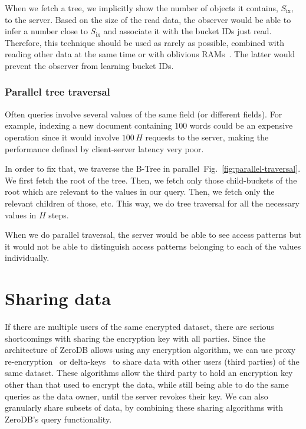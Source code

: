 \documentclass[notitlepage,longbibliography]{revtex4-1}
\newcommand{\figref}[1]{Fig.~\ref{#1}}
\begin{document}
When we fetch a tree, we implicitly show the number of objects it contains, $S_{\mbox{ix}}$, to the server.
Based on the size of the read data, the observer would be able to infer a number close to $S_{\mbox{ix}}$ and associate it with the bucket IDs just read.
Therefore, this technique should be used as rarely as possible, combined with reading other data at the same time or with oblivious RAMs~\cite{path-oram,burst-oram,oram-multicloud,ods-wang-2014}.
The latter would prevent the observer from learning bucket IDs.

\subsubsection{Parallel tree traversal}
\label{sec:parallel-traversal}

Often queries involve several values of the same field (or different fields).
For example, indexing a new document containing $100$ words could be an expensive operation since it would involve $100\,H$ requests to the server, making the performance defined by client-server latency very poor.

In order to fix that, we traverse the B-Tree in parallel~\figref{fig:parallel-traversal}.
We first fetch the root of the tree.
Then, we fetch only those child-buckets of the root which are relevant to the values in our query.
Then, we fetch only the relevant children of those, etc.
This way, we do tree traversal for all the necessary values in $H$ steps.

When we do parallel traversal, the server would be able to see access patterns but it would not be able to distinguish access patterns belonging to each of the values individually.

\section{Sharing data}

If there are multiple users of the same encrypted dataset, there are serious shortcomings with sharing the encryption key with all parties.
Since the architecture of ZeroDB allows using any encryption algorithm, we can use proxy re-encryption~\cite{afgh,libert2011unidirectional}
or delta-keys~\cite{delta-keys,mylar} to share data with other users (third parties) of the same dataset.
These algorithms allow the third party to hold an encryption key other than that used to encrypt the data,
while still being able to do the same queries as the data owner, until the server revokes their key.
We can also granularly share subsets of data, by combining these sharing algorithms with ZeroDB's query functionality.
\end{document}
